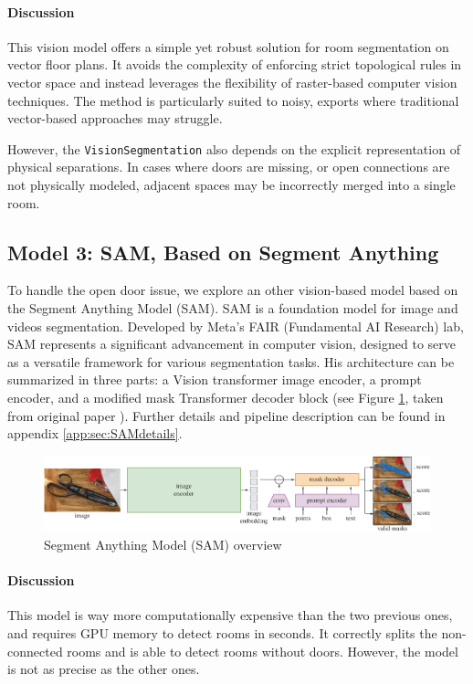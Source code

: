 \documentclass[11pt]{article}
\begin{document}
\paragraph{Discussion}
This vision model offers a simple yet robust solution for room segmentation on 
vector floor plans. It avoids the complexity of enforcing strict topological 
rules in vector space and instead leverages the flexibility of raster-based computer 
vision techniques. The method is particularly suited to noisy, exports where 
traditional vector-based approaches may struggle.

However, the \texttt{VisionSegmentation} also depends on the explicit representation of physical separations. 
In cases where doors are missing, or open connections are not physically modeled, 
adjacent spaces may be incorrectly merged into a single room.


\subsection{Model 3: SAM, Based on Segment Anything}
To handle the open door issue, we explore an other vision-based model 
based on the Segment Anything Model 
(SAM)\cite{kirillov2023segment}. SAM is a foundation model for image and videos segmentation. Developed by 
Meta's FAIR (Fundamental AI Research) lab, SAM represents a significant advancement 
in computer vision, designed to serve as a versatile framework for various 
segmentation tasks. His architecture can be summarized in three parts: a Vision 
transformer image encoder, a prompt encoder, and a modified mask Transformer decoder
 block (see Figure \ref{fig:SAMmodel_diagram}, taken from original paper \cite{kirillov2023segment}).
 Further details and pipeline description 
 can be found in appendix \ref{app:sec:SAMdetails}. 

\begin{figure}[htb!]
    \centering
    \includegraphics[width=0.9\linewidth]{figures/SAM_model_diagram.pdf}
    \caption{Segment Anything Model (SAM) overview}
    \label{fig:SAMmodel_diagram}
\end{figure}


\paragraph{Discussion}
This model is way more computationally expensive than the two previous ones, 
and requires GPU memory to detect rooms in seconds. It correctly splits
the non-connected rooms and is able to detect rooms without doors.
However, the model is not as precise as the other ones.
\end{document}
